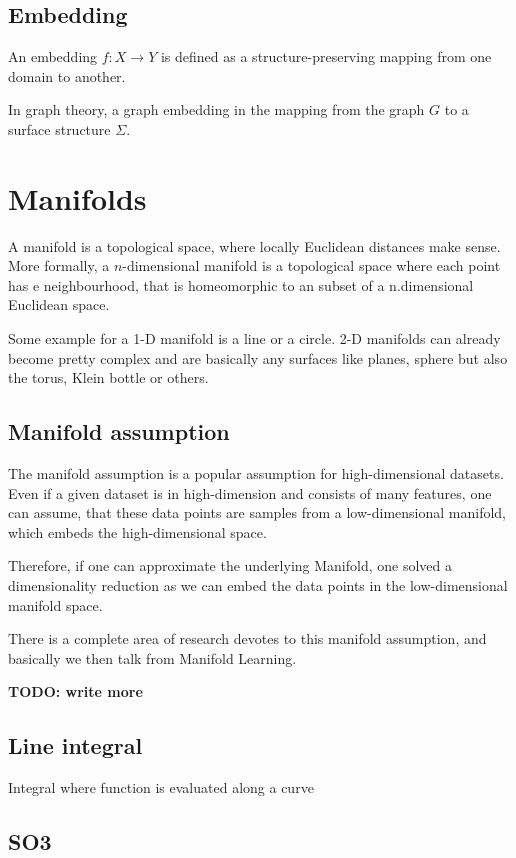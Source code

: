 \subsection{Embedding}
An embedding $f: X \rightarrow Y$ is defined as a structure-preserving mapping from one domain to another.

In graph theory, a graph embedding in the mapping from the graph $G$
to a surface structure $\Sigma$. 



\section{Manifolds}
A manifold is a topological space, where locally Euclidean distances make sense.
More formally, a $n$-dimensional manifold is a topological space where
each point has e neighbourhood, that is homeomorphic to an subset of a n.dimensional
Euclidean space.

Some example for a 1-D manifold is a line or a circle. 2-D manifolds can already become 
pretty complex and are basically any surfaces like planes, sphere but also the torus,
Klein bottle or others.

\subsection{Manifold assumption}
\label{sec:manifoldAssumption}

The manifold assumption is a popular assumption for high-dimensional datasets.
Even if a given dataset is in high-dimension and consists of many features, one can assume,
that these data points are samples from a low-dimensional manifold, 
which embeds the high-dimensional space.

Therefore, if one can approximate the underlying Manifold, one solved a dimensionality reduction
as we can embed the data points in the low-dimensional manifold space.

There is a complete area of research devotes to this manifold assumption, and basically
we then talk from Manifold Learning. 

\textbf{TODO: write more} \cite{ManifoldLearning}


\subsection{Line integral}
Integral where function is evaluated along a curve

\subsection{SO3}
